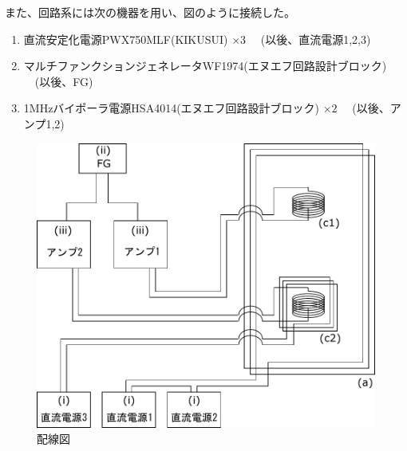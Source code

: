 また、回路系には次の機器を用い、図のように接続した。
\begin{enumerate}
\renewcommand{\labelenumi}{(\roman{enumi})}
\item 直流安定化電源PWX750MLF(KIKUSUI) $\times 3$ \ \ (以後、直流電源1,2,3)
\item マルチファンクションジェネレータWF1974(エヌエフ回路設計ブロック) \ \ (以後、FG)
\item 1MHzバイポーラ電源HSA4014(エヌエフ回路設計ブロック) $\times 2$ \ \ (以後、アンプ1,2)
\end{enumerate}

\vspace{5mm}
\begin{figure}[h]
\centering
\includegraphics[width=12cm]{resonance/whatwhyhow/kairozu.pdf}
\caption{配線図}
\vspace{-5mm}
\end{figure}

\clearpage
